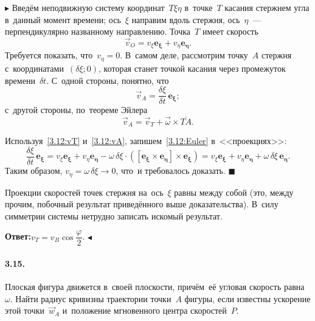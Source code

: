 \documentclass{weekly}
\begin{document}
$\blacktriangleright$ Введём неподвижную систему координат~$T\xi\eta$
в~точке~$T$ касания стержнем угла в~данный момент времени;
ось~$\xi$ направим вдоль стержня,
ось~$\eta$~--- перпендикулярно названному направлению.
Точка~$T$ имеет скорость
\begin{equation}\label{3.12:vT}
    \vec v_O = v_\xi \mathbf{e_\xi} + v_\eta \mathbf{e_\eta}.
\end{equation}
Требуется показать, что~$v_\eta = 0$. В~самом деле, рассмотрим
точку~$A$ стержня с~координатами~$(\delta \xi; 0)$,
которая станет точкой касания через промежуток времени~$\delta t$.
С~одной стороны, понятно, что
\begin{equation}\label{3.12:vA}
    \vec v_A = \frac{\delta \xi}{\delta t} \,\mathbf{e_\xi};
\end{equation}
с~другой стороны, по~теореме Эйлера
\begin{equation}\label{3.12:Euler}
    \vec v_A = \vec v_T + \vec\omega \times \overline{TA}.
\end{equation}

Используя~\eqref{3.12:vT} и~\eqref{3.12:vA}, запишем~\eqref{3.12:Euler}
в~<<проекциях>>:
\begin{equation}
    \frac{\delta\xi}{\delta t} \,\mathbf{e_\xi}
        = v_\xi \mathbf{e_\xi} + v_\eta \mathbf{e_\eta} -
            \omega\,\delta\xi \cdot
            \left(\mathbf{[e_\xi \times e_\eta] \times
                \mathbf{e_\xi}}\right)
        = v_\xi \mathbf{e_\xi} + v_\eta \mathbf{e_\eta} +
            \omega\,\delta\xi \,\mathbf{e_\eta}.
\end{equation}
Таким образом, $v_\eta = \omega \,\delta\xi \to 0$,
что~и требовалось доказать. \hfill $\blacksquare$

Проекции скоростей точек стержня
на~ось~$\xi$ равны между собой (это, между прочим, побочный результат
приведённого выше доказательства). В~силу симметрии системы
нетрудно записать искомый результат.

\textbf{Ответ:}\quad $v_T = v_B \cos\dfrac{\varphi}{2}$.
\hfill $\blacktriangleleft$


\paragraph{3.15.} Плоская фигура движется в~своей плоскости,
причём~её угловая скорость равна~$\omega$. Найти радиус кривизны
траектории точки~$A$ фигуры, если известны ускорение
этой точки~$\vec w_A$ и~положение мгновенного центра скоростей~$P$.
\end{document}
